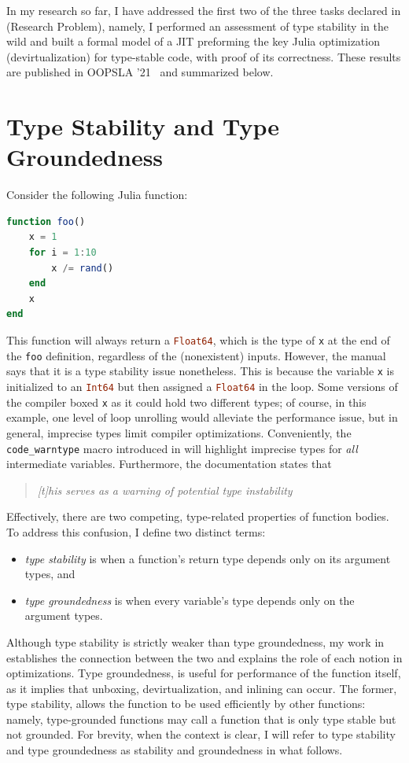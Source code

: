 \documentclass[oneside,openright,titlepage,numbers=noenddot,%
headinclude,footinclude,cleardoublepage=empty,abstract=on,
BCOR=5mm,paper=a4,fontsize=11pt,
dvipsnames
]{scrreprt}
\renewcommand{\c}[1]{\lstinline[language=Julia]!#1!\xspace}
\newenvironment{itquote}{\begin{quote}\itshape}{\end{quote}\ignorespacesafterend}
\begin{document}
In my research so far, I have addressed the first two of the three tasks
declared in  (Research Problem), namely, I performed an
assessment of type stability in the wild and built a formal model of a JIT
preforming the key Julia optimization (devirtualization) for type-stable code,
with proof of its correctness. These results are published in OOPSLA
'21~\cite{Pelenitsyn21} and summarized below.


\section{Type Stability and Type Groundedness}%
\label{sec:ts-tg}

Consider the following Julia function:
\begin{lstlisting}[language=julia]
function foo()
    x = 1
    for i = 1:10
        x /= rand()
    end
    x
end
\end{lstlisting}
This function will always return a \c{Float64}, which is the type of \c{x} at
the end of the \c{foo} definition, regardless of the (nonexistent) inputs.
However, the manual says that it is a type stability issue nonetheless. This is
because the variable \c{x} is initialized to an \c{Int64} but then assigned a
\c{Float64} in the loop. Some versions of the compiler boxed \c{x} as it could
hold two different types; of course, in this example, one level of loop
unrolling would alleviate the performance issue, but in general, imprecise types
limit compiler optimizations. Conveniently, the \c{code_warntype} macro
introduced in  will highlight imprecise types for
\emph{all} intermediate variables. Furthermore, the documentation states that
\begin{itquote}
  [t]his serves as a warning of potential type instability
\end{itquote}

Effectively, there are two competing, type-related properties of function
bodies. To address this confusion, I define two distinct terms:
\begin{itemize}
  \item \emph{type stability} is when a function's return type depends only on
    its argument types, and
  \item \emph{type groundedness} is when every variable's type depends
    only on the argument types.
\end{itemize}
Although type stability is strictly weaker than type groundedness,
my work in~\cite{Pelenitsyn21} establishes the connection between the two and
explains the role of each notion in optimizations. Type
groundedness, is useful for performance of the function itself, as it implies
that unboxing, devirtualization, and inlining can occur. The former, type
stability, allows the function to be used efficiently by other functions:
namely, type-grounded functions may call a function that is only type stable but
not grounded. For brevity, when the context is clear, I will refer to type
stability and type groundedness as stability and groundedness in what follows.
\end{document}
